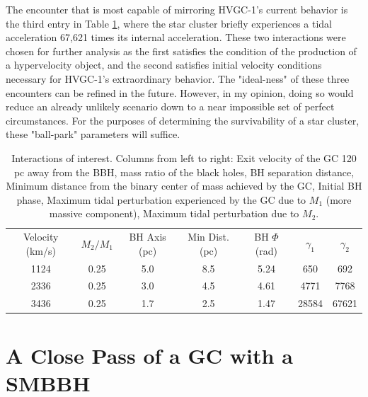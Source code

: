 \documentclass{aastex62}
\begin{document}
The encounter that is most capable of mirroring HVGC-1's current behavior is the third entry in Table \ref{results}, where the star cluster briefly experiences a tidal acceleration 67,621 times its internal acceleration. These two interactions were chosen for further analysis as the first satisfies the condition of the production of a hypervelocity object, and the second satisfies initial velocity conditions necessary for HVGC-1's extraordinary behavior. The "ideal-ness" of these three encounters can be refined in the future. However, in my opinion, doing so would reduce an already unlikely scenario down to a near impossible set of perfect circumstances. For the purposes of determining the survivability of a star cluster, these "ball-park" parameters will suffice. 

\begin{table}
\centering
\caption{Interactions of interest. Columns from left to right: Exit velocity of the GC 120 pc away from the BBH, mass ratio of the black holes, BH separation distance, Minimum distance from the binary center of mass achieved by the GC, Initial BH phase, Maximum tidal perturbation experienced by the GC due to $M_{1}$ (more massive component), Maximum tidal perturbation due to $M_{2}$. \label{results}}

\begin{tabular}{ccccccc}
\hline \hline
Velocity (km/s) & $M_{2}/M_{1}$ & BH Axis (pc) & Min Dist. (pc) & BH $\Phi$ (rad) & $\gamma_{1}$ & $\gamma_{2}$  \\
1124 & 0.25 & 5.0 & 8.5 & 5.24 & 650 & 692 \\
2336 & 0.25 & 3.0 & 4.5 & 4.61 & 4771 & 7768 \\
3436 & 0.25 & 1.7 & 2.5 & 1.47 & 28584 & 67621 \\
\end{tabular}
\end{table}



\section{A Close Pass of a GC with a SMBBH}
\end{document}

